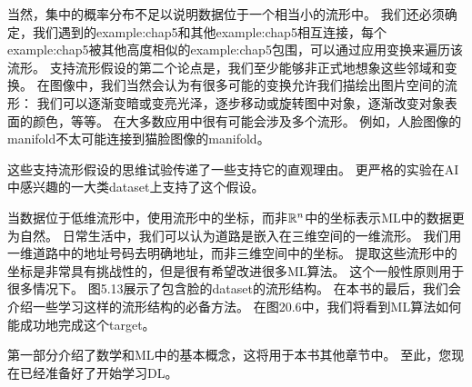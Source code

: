 当然，集中的概率分布不足以说明数据位于一个相当小的流形中。
我们还必须确定，我们遇到的\gls{example:chap5}和其他\gls{example:chap5}相互连接，每个\gls{example:chap5}被其他高度相似的\gls{example:chap5}包围，可以通过应用变换来遍历该流形。
支持流形假设的第二个论点是，我们至少能够非正式地想象这些邻域和变换。
在图像中，我们当然会认为有很多可能的变换允许我们描绘出图片空间的流形：
我们可以逐渐变暗或变亮光泽，逐步移动或旋转图中对象，逐渐改变对象表面的颜色，等等。
在大多数应用中很有可能会涉及多个流形。
例如，人脸图像的\gls{manifold}不太可能连接到猫脸图像的\gls{manifold}。


这些支持流形假设的思维试验传递了一些支持它的直观理由。
更严格的实验\citep{Cayton-2005,Narayanan+Mitter-NIPS2010,Scholkopf98-book,Roweis2000-lle-small,Tenenbaum2000-isomap,Brand2003,Belkin+Niyogi-nips2003,Donoho+Carrie-03,Weinberger04a}在\gls{AI}中感兴趣的一大类\gls{dataset}上支持了这个假设。

当数据位于低维流形中，使用流形中的坐标，而非$\mathbb{R}^n$中的坐标表示\gls{ML}中的数据更为自然。
日常生活中，我们可以认为道路是嵌入在三维空间的一维流形。
我们用一维道路中的地址号码去明确地址，而非三维空间中的坐标。
提取这些流形中的坐标是非常具有挑战性的，但是很有希望改进很多\gls{ML}算法。
这个一般性原则用于很多情况下。
图5.13展示了包含脸的\gls{dataset}的流形结构。
在本书的最后，我们会介绍一些学习这样的流形结构的必备方法。
在图20.6中，我们将看到\gls{ML}算法如何能成功地完成这个\gls{target}。

第一部分介绍了数学和\gls{ML}中的基本概念，这将用于本书其他章节中。
至此，您现在已经准备好了开始学习\gls{DL}。




